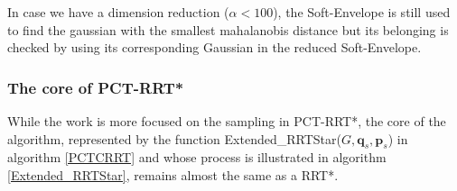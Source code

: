 \documentclass[letterpaper, 10 pt, conference]{ieeeconf}  %
\newcommand{\mb}[1]{{\boldsymbol{#1}}}
\begin{document}
In case we have a dimension reduction ($\alpha<100$), the Soft-Envelope is still used to find the gaussian with the smallest mahalanobis distance but its belonging is checked by using its corresponding Gaussian in the reduced Soft-Envelope.\\
\subsubsection{The core of PCT-RRT*}\leavevmode\par \label{CoreRRTStar} \label{coreRRTstarChapter}
While the work is more focused on the sampling in PCT-RRT*, the core of the algorithm, represented by the function {\selectfont Extended\_RRTStar($G,\mb{q}_s,\mb{p}_s$)} in algorithm \ref{PCTCRRT} and whose process is illustrated in algorithm \ref{Extended_RRTStar}, remains almost the same as a RRT*.\\
\end{document}
